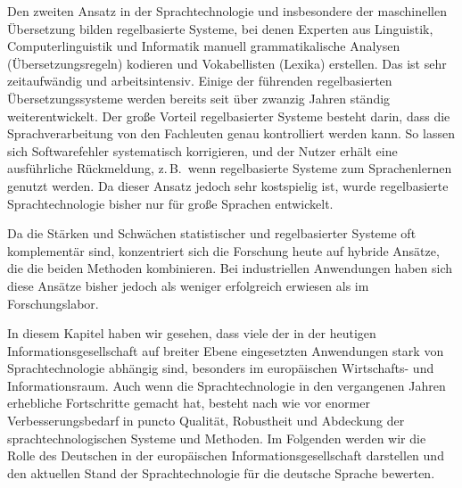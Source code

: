 \documentclass[]{../../metanetpaper}
\begin{document}
\begin{multicols}{2}
Den zweiten Ansatz in der Sprachtechnologie und insbesondere der maschinellen Übersetzung bilden regelbasierte Systeme, bei denen Experten aus Linguistik, Computerlinguistik und Informatik manuell grammatikalische Analysen (Übersetzungsregeln) kodieren und Vokabellisten (Lexika) erstellen. Das ist sehr zeitaufwändig und arbeitsintensiv. Einige der führenden regelbasierten Übersetzungssysteme werden bereits seit über zwanzig Jahren ständig weiterentwickelt. Der große Vorteil regelbasierter Systeme besteht darin, dass die Sprachverarbeitung von den Fachleuten genau kontrolliert werden kann. So lassen sich Softwarefehler systematisch korrigieren, und der Nutzer erhält eine ausführliche Rückmeldung, z.\,B.~wenn regelbasierte Systeme zum Sprachenlernen genutzt werden. Da dieser Ansatz jedoch sehr kostspielig ist, wurde regelbasierte Sprachtechnologie bisher nur für große Sprachen entwickelt.

Da die Stärken und Schwächen statistischer und regelbasierter Systeme oft komplementär sind, konzentriert sich die Forschung heute auf hybride Ansätze, die die beiden Methoden kombinieren. Bei industriellen Anwendungen haben sich diese Ansätze bisher jedoch als weniger erfolgreich erwiesen als im Forschungslabor. 

In diesem Kapitel haben wir gesehen, dass viele der in der heutigen Informationsgesellschaft auf breiter Ebene eingesetzten Anwendungen stark von Sprachtechnologie abhängig sind, besonders im europäischen Wirtschafts- und Informationsraum. Auch wenn die Sprachtechnologie in den vergangenen Jahren erhebliche Fortschritte gemacht hat, besteht nach wie vor enormer Verbesserungsbedarf in puncto Qualität, Robustheit und Abdeckung der sprachtechnologischen Systeme und Methoden. Im Folgenden werden wir die Rolle des Deutschen in der europäischen Informationsgesellschaft darstellen und den aktuellen Stand der Sprachtechnologie für die deutsche Sprache bewerten.  
\end{multicols}

\clearpage

\end{document}
